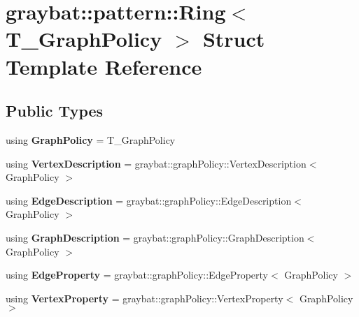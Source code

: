 \hypertarget{structgraybat_1_1pattern_1_1Ring}{}\section{graybat\+:\+:pattern\+:\+:Ring$<$ T\+\_\+\+Graph\+Policy $>$ Struct Template Reference}
\label{structgraybat_1_1pattern_1_1Ring}
\subsection*{Public Types}
\begin{DoxyCompactItemize}
\item 
\hypertarget{structgraybat_1_1pattern_1_1Ring_aebb4517df89c5e5fe6de9b970e0a2815}{}using {\bfseries Graph\+Policy} = T\+\_\+\+Graph\+Policy\label{structgraybat_1_1pattern_1_1Ring_aebb4517df89c5e5fe6de9b970e0a2815}

\item 
\hypertarget{structgraybat_1_1pattern_1_1Ring_aca9cf36b522b5a565189cd7b30c5f594}{}using {\bfseries Vertex\+Description} = graybat\+::graph\+Policy\+::\+Vertex\+Description$<$ Graph\+Policy $>$\label{structgraybat_1_1pattern_1_1Ring_aca9cf36b522b5a565189cd7b30c5f594}

\item 
\hypertarget{structgraybat_1_1pattern_1_1Ring_a53594d4bfdfaf36aac2b77138f7d9b24}{}using {\bfseries Edge\+Description} = graybat\+::graph\+Policy\+::\+Edge\+Description$<$ Graph\+Policy $>$\label{structgraybat_1_1pattern_1_1Ring_a53594d4bfdfaf36aac2b77138f7d9b24}

\item 
\hypertarget{structgraybat_1_1pattern_1_1Ring_a2267dd3093e5d89dc963dfc395771fd0}{}using {\bfseries Graph\+Description} = graybat\+::graph\+Policy\+::\+Graph\+Description$<$ Graph\+Policy $>$\label{structgraybat_1_1pattern_1_1Ring_a2267dd3093e5d89dc963dfc395771fd0}

\item 
\hypertarget{structgraybat_1_1pattern_1_1Ring_a63d5e2d31d9c26b9516c0de8860eb460}{}using {\bfseries Edge\+Property} = graybat\+::graph\+Policy\+::\+Edge\+Property$<$ Graph\+Policy $>$\label{structgraybat_1_1pattern_1_1Ring_a63d5e2d31d9c26b9516c0de8860eb460}

\item 
\hypertarget{structgraybat_1_1pattern_1_1Ring_a5091e1a87b0cfc92769718a09451839c}{}using {\bfseries Vertex\+Property} = graybat\+::graph\+Policy\+::\+Vertex\+Property$<$ Graph\+Policy $>$\label{structgraybat_1_1pattern_1_1Ring_a5091e1a87b0cfc92769718a09451839c}

\end{DoxyCompactItemize}
